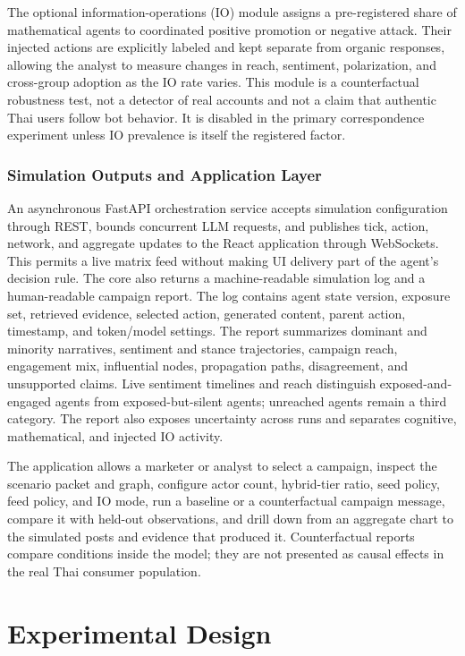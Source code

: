 \documentclass[conference]{IEEEtran}
\begin{document}
The optional information-operations (IO) module assigns a pre-registered share
of mathematical agents to coordinated positive promotion or negative attack.
Their injected actions are explicitly labeled and kept separate from organic
responses, allowing the analyst to measure changes in reach, sentiment,
polarization, and cross-group adoption as the IO rate varies. This module is a
counterfactual robustness test, not a detector of real accounts and not a claim
that authentic Thai users follow bot behavior. It is disabled in the primary
correspondence experiment unless IO prevalence is itself the registered factor.

\subsubsection{Simulation Outputs and Application Layer}

An asynchronous FastAPI orchestration service accepts simulation configuration
through REST, bounds concurrent LLM requests, and publishes tick, action,
network, and aggregate updates to the React application through WebSockets.
This permits a live matrix feed without making UI delivery part of the agent's
decision rule. The core also returns a machine-readable simulation log and a
human-readable campaign report. The
log contains agent state version, exposure set, retrieved evidence, selected
action, generated content, parent action, timestamp, and token/model settings.
The report summarizes dominant and minority narratives, sentiment and stance
trajectories, campaign reach, engagement mix, influential nodes, propagation
paths, disagreement, and unsupported claims. Live sentiment timelines and
reach distinguish exposed-and-engaged agents from exposed-but-silent agents;
unreached agents remain a third category. The report also exposes uncertainty
across runs and separates cognitive, mathematical, and injected IO activity.

The application allows a marketer or analyst to select a campaign, inspect the
scenario packet and graph, configure actor count, hybrid-tier ratio, seed
policy, feed policy, and IO mode, run a baseline or a counterfactual campaign
message, compare it with held-out
observations, and drill down from an aggregate chart to the simulated posts
and evidence that produced it. Counterfactual reports compare conditions
inside the model; they are not presented as causal effects in the real Thai
consumer population.

\section{Experimental Design}
\end{document}

